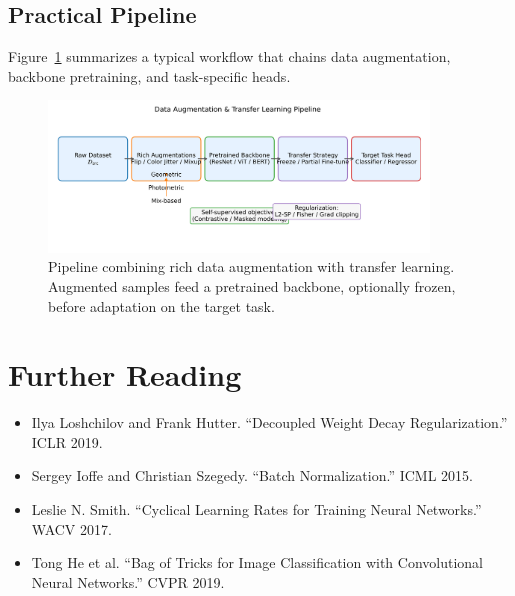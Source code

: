 \documentclass{article}
\begin{document}
\subsection{Practical Pipeline}
Figure~\ref{fig:augmentation_transfer_pipeline} summarizes a typical workflow that chains data augmentation, backbone pretraining, and task-specific heads.

\begin{figure}[H]
  \centering
  \includegraphics[width=0.9\textwidth]{augmentation_transfer_pipeline.png}
  \caption{Pipeline combining rich data augmentation with transfer learning. Augmented samples feed a pretrained backbone, optionally frozen, before adaptation on the target task.}
  \label{fig:augmentation_transfer_pipeline}
\end{figure}
\FloatBarrier

\section*{Further Reading}
\begin{itemize}
  \item Ilya Loshchilov and Frank Hutter. ``Decoupled Weight Decay Regularization.'' ICLR 2019.
  \item Sergey Ioffe and Christian Szegedy. ``Batch Normalization.'' ICML 2015.
  \item Leslie N. Smith. ``Cyclical Learning Rates for Training Neural Networks.'' WACV 2017.
  \item Tong He et al. ``Bag of Tricks for Image Classification with Convolutional Neural Networks.'' CVPR 2019.
\end{itemize}
\end{document}
